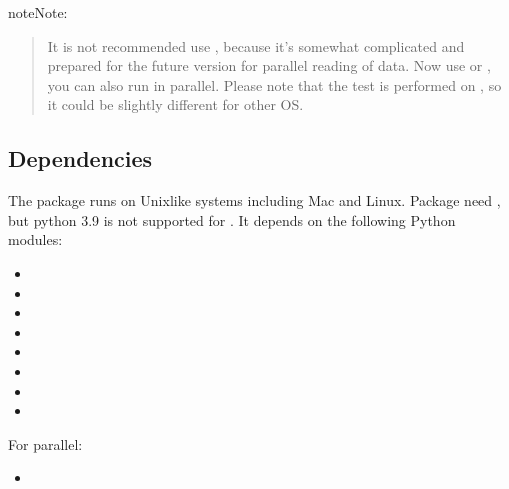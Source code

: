 \documentclass[a4paper,10pt,english,openany]{sphinxmanual}
\begin{document}
\begin{sphinxadmonition}{note}{Note:}
🚨  🚨
\begin{quote}

It is not recommended use , because it’s somewhat complicated and
prepared for the future version for parallel reading of data. Now use  or
, you can also run  in parallel. Please note that the test
is performed on , so it could be slightly different for other OS.
\end{quote}
\end{sphinxadmonition}


\subsection{Dependencies}
\label{\detokenize{installation:dependencies}}
The package  runs on Unix\sphinxhyphen{}like systems including Mac and Linux. Package need
, but python 3.9 is not supported for . It depends on the
following Python modules:
\begin{itemize}
\item {} 

\item {} 

\item {} 

\item {} 

\item {} 

\item {} 

\item {} 

\item {} 

\end{itemize}

For parallel:
\begin{itemize}
\item {} 
%
\begin{footnote}[2]\sphinxAtStartFootnote
{}
%
\end{footnote}

\end{itemize}
\end{document}
